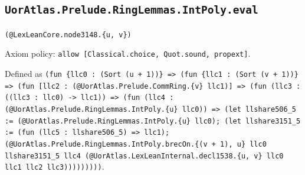 \documentclass[11pt]{article}
\begin{document}
\subsection*{\texttt{UorAtlas.Prelude.RingLemmas.IntPoly.eval}}
\noindent\texttt{(@LexLeanCore.node3148.\{u, v\})}\par
\noindent Axiom policy: \texttt{allow [Classical.choice, Quot.sound, propext]}.\par
\noindent Defined as \texttt{(fun \{llc0 : (Sort (u + 1))\} => (fun \{llc1 : (Sort (v + 1))\} => (fun [llc2 : (@UorAtlas.Prelude.CommRing.\{v\} llc1)] => (fun (llc3 : ((llc3 : llc0) -> llc1)) => (fun (llc4 : (@UorAtlas.Prelude.RingLemmas.IntPoly.\{u\} llc0)) => (let llshare506\_5 := (@UorAtlas.Prelude.RingLemmas.IntPoly.\{u\} llc0); (let llshare3151\_5 := (fun (llc5 : llshare506\_5) => llc1); (@UorAtlas.Prelude.RingLemmas.IntPoly.brecOn.\{(v + 1), u\} llc0 llshare3151\_5 llc4 (@UorAtlas.LexLeanInternal.decl1538.\{u, v\} llc0 llc1 llc2 llc3)))))))))}.\par
\end{document}
